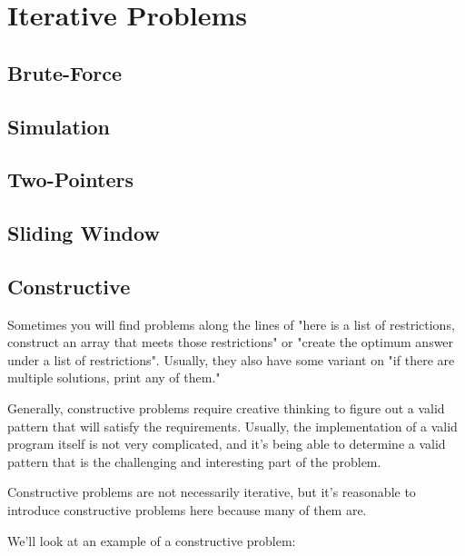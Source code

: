 \section{Iterative Problems}
\subsection{Brute-Force}
\subsection{Simulation}
\subsection{Two-Pointers}
\subsection{Sliding Window}
\subsection{Constructive}

Sometimes you will find problems along the lines of "here is a list of restrictions, construct an array that meets those restrictions" or "create the optimum answer under a list of restrictions". Usually, they also have some variant on "if there are multiple solutions, print any of them."

Generally, constructive problems require creative thinking to figure out a valid pattern that will satisfy the requirements. Usually, the implementation of a valid program itself is not very complicated, and it's being able to determine a valid pattern that is the challenging and interesting part of the problem.

Constructive problems are not necessarily iterative, but it's reasonable to introduce constructive problems here because many of them are.

We'll look at an example of a constructive problem:

\hrulefill

